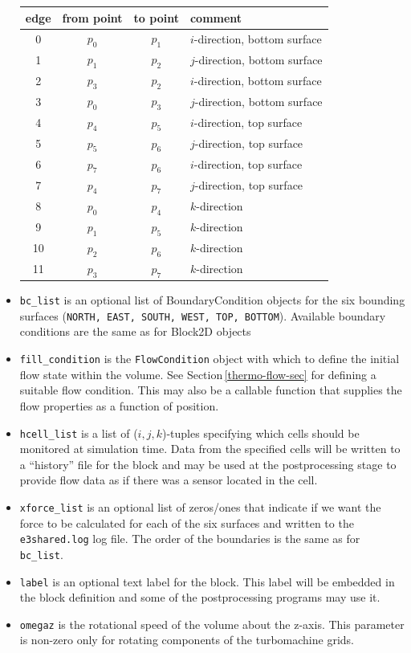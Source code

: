 \documentclass[12pt,a4paper,twoside]{article}
\begin{document}
\begin{itemize}
\begin{table}
\begin{center}
\begin{tabular}{cccl}
      \hline\hline
      edge & from point & to point & comment \\ 
      \hline
      0  & $p_0$      & $p_1$    & $i$-direction, bottom surface \\
      1  & $p_1$      & $p_2$    & $j$-direction, bottom surface \\
      2  & $p_3$      & $p_2$    & $i$-direction, bottom surface \\
      3  & $p_0$      & $p_3$    & $j$-direction, bottom surface \\
      4  & $p_4$      & $p_5$    & $i$-direction, top surface \\
      5  & $p_5$      & $p_6$    & $j$-direction, top surface \\
      6  & $p_7$      & $p_6$    & $i$-direction, top surface \\
      7  & $p_4$      & $p_7$    & $j$-direction, top surface \\
      8  & $p_0$      & $p_4$    & $k$-direction \\
      9  & $p_1$      & $p_5$    & $k$-direction \\
      10 & $p_2$      & $p_6$    & $k$-direction \\
      11 & $p_3$      & $p_7$    & $k$-direction \\
      \hline \hline
    \end{tabular}
  \end{center}
\end{table}
\item \texttt{bc\_list} is an optional list of BoundaryCondition objects for the 
  six bounding surfaces (\texttt{NORTH, EAST, SOUTH, WEST, TOP, BOTTOM}).
  Available boundary conditions are the same as for Block2D objects
\item \texttt{fill\_condition} is the \texttt{FlowCondition} object with which to
  define the initial flow state within the volume.
  See Section\,\ref{thermo-flow-sec} for defining a suitable flow condition.
  This may also be a callable function that supplies the flow properties as
  a function of position.
\item \texttt{hcell\_list} is a list of ($i,j,k$)-tuples specifying which
  cells should be monitored at simulation time.
  Data from the specified cells will be written to a ``history'' file for the
  block and may be used at the postprocessing stage to provide flow data as if
  there was a sensor located in the cell.
\item \texttt{xforce\_list} is an optional list of zeros/ones that indicate if we
  want the force to be calculated for each of the six surfaces and written to the 
  \texttt{e3shared.log} log file.
  The order of the boundaries is the same as for \texttt{bc\_list}.
\item \texttt{label} is an optional text label for the block.  This label
  will be embedded in the block definition and some of the postprocessing
  programs may use it.
\item \texttt{omegaz} is the rotational speed of the volume about the z-axis.
  This parameter is non-zero only for rotating components of the turbomachine grids.
\end{itemize} 
\end{document}
